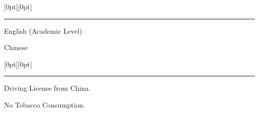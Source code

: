 \documentclass[a4paper,12pt]{letter}
\begin{document}
\secb



\raisebox{0pt}[0pt][0pt]{\Large\textbf{\raisebox{-3.5ex}{Language Skill}}} 
\\[2mm]
\rule[-0.5cm]{10cm}{1pt}

% 

\begin{shortitemize}
\item \textrm{\normalsize English (Academic Level)}
\item \textrm{\normalsize Chinese}
\end{shortitemize}
\secb



\raisebox{0pt}[0pt][0pt]{\Large\textbf{\raisebox{-3.5ex}{Additional Information}}} 
\\[2mm]
\rule[-0.5cm]{10cm}{1pt}



\begin{shortitemize}
\item \textrm{\normalsize Driving License from China.}
\item \textrm{\normalsize No Tobacco Consumption.}
\end{shortitemize}

\secb

\end{document}
